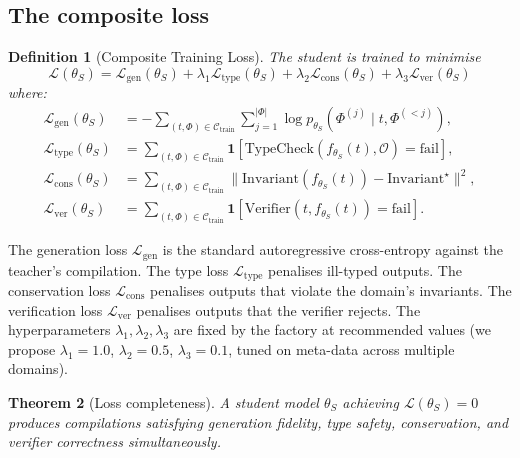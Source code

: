 \documentclass[twocolumn,11pt,a4paper]{article}
\newtheorem{theorem}{Theorem}[section]
\newtheorem{definition}[theorem]{Definition}
\newcommand{\cO}{\mathcal{O}}
\newcommand{\cC}{\mathcal{C}}
\newcommand{\cL}{\mathcal{L}}
\begin{document}
\subsection{The composite loss}

\begin{definition}[Composite Training Loss]
\label{def:composite-loss}
The student is trained to minimise
\begin{equation}
\label{eq:composite-loss}
\cL(\theta_S) = \cL_{\mathrm{gen}}(\theta_S) + \lambda_1 \cL_{\mathrm{type}}(\theta_S) + \lambda_2 \cL_{\mathrm{cons}}(\theta_S) + \lambda_3 \cL_{\mathrm{ver}}(\theta_S)
\end{equation}
where:
\begin{align}
\cL_{\mathrm{gen}}(\theta_S) &= - \sum_{(t, \Phi) \in \cC_{\mathrm{train}}} \sum_{j=1}^{|\Phi|} \log p_{\theta_S}(\Phi^{(j)} \mid t, \Phi^{(< j)}),\\
\cL_{\mathrm{type}}(\theta_S) &= \sum_{(t, \Phi) \in \cC_{\mathrm{train}}} \mathbf{1}[\mathrm{TypeCheck}(f_{\theta_S}(t), \cO) = \mathrm{fail}],\\
\cL_{\mathrm{cons}}(\theta_S) &= \sum_{(t, \Phi) \in \cC_{\mathrm{train}}} \| \mathrm{Invariant}(f_{\theta_S}(t)) - \mathrm{Invariant}^\star \|^2,\\
\cL_{\mathrm{ver}}(\theta_S) &= \sum_{(t, \Phi) \in \cC_{\mathrm{train}}} \mathbf{1}[\mathrm{Verifier}(t, f_{\theta_S}(t)) = \mathrm{fail}].
\end{align}
\end{definition}

The generation loss $\cL_{\mathrm{gen}}$ is the standard autoregressive cross-entropy against the teacher's compilation. The type loss $\cL_{\mathrm{type}}$ penalises ill-typed outputs. The conservation loss $\cL_{\mathrm{cons}}$ penalises outputs that violate the domain's invariants. The verification loss $\cL_{\mathrm{ver}}$ penalises outputs that the verifier rejects. The hyperparameters $\lambda_1, \lambda_2, \lambda_3$ are fixed by the factory at recommended values (we propose $\lambda_1 = 1.0$, $\lambda_2 = 0.5$, $\lambda_3 = 0.1$, tuned on meta-data across multiple domains).

\begin{theorem}[Loss completeness]
\label{thm:loss-completeness}
A student model $\theta_S$ achieving $\cL(\theta_S) = 0$ produces compilations satisfying generation fidelity, type safety, conservation, and verifier correctness simultaneously.
\end{theorem}
\end{document}
